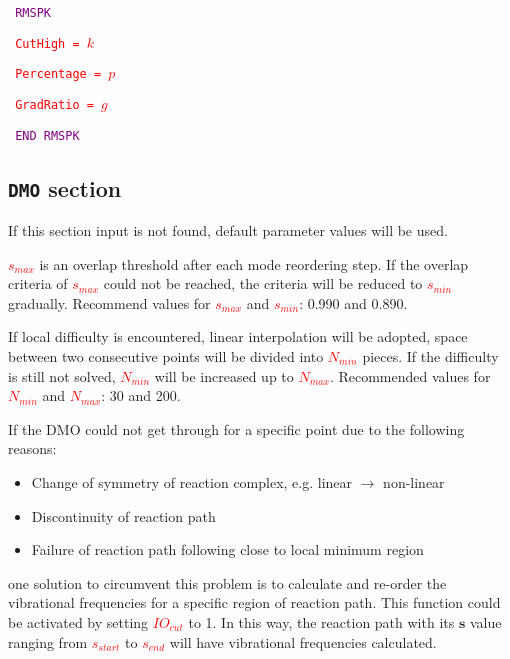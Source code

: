 \texttt{
\textcolor{Purple}{RMSPK}}

\texttt{
\textcolor{red}{CutHigh = $k$}}

\texttt{
\textcolor{red}{Percentage = $p$}}


\texttt{
\textcolor{red}{GradRatio = $g$}}


\texttt{
\textcolor{Purple}{END RMSPK}}




\subsection{\texttt{DMO} section }
If this section input is not found, default parameter values will be used. 


\texttt{\textcolor{red}{$s_{max}$}} is an overlap threshold after each mode reordering step. If the overlap criteria of \texttt{\textcolor{red}{$s_{max}$}} could not be reached, the criteria will be reduced to \texttt{\textcolor{red}{$s_{min}$}} gradually. Recommend values for \texttt{\textcolor{red}{$s_{max}$}} and \texttt{\textcolor{red}{$s_{min}$}}: 0.990 and 0.890.

If local difficulty is encountered, linear interpolation will be adopted, space between two consecutive points will be divided into \texttt{\textcolor{red}{$N_{min}$}} pieces. If the difficulty is still not solved, \texttt{\textcolor{red}{$N_{min}$}} will be increased up to \texttt{\textcolor{red}{$N_{max}$}}. Recommended values for \texttt{\textcolor{red}{$N_{min}$}} and \texttt{\textcolor{red}{$N_{max}$}}: 30 and 200.


If the DMO could not get through for a specific point due to the following reasons:

\begin{itemize}
   \item Change of symmetry of reaction complex, e.g. linear $\rightarrow$ non-linear 
   \item Discontinuity of reaction path
   \item Failure of reaction path following close to local minimum region 
\end{itemize}

one solution to circumvent this problem is to calculate and re-order the vibrational frequencies for a specific region of reaction path. This function could be activated by setting \texttt{\textcolor{red}{$IO_{cut}$}} to 1. In this way, the reaction path with its $\mathbf{s}$ value ranging from \texttt{\textcolor{red}{$s_{start}$}} to \texttt{\textcolor{red}{$s_{end}$}} will have vibrational frequencies calculated.

